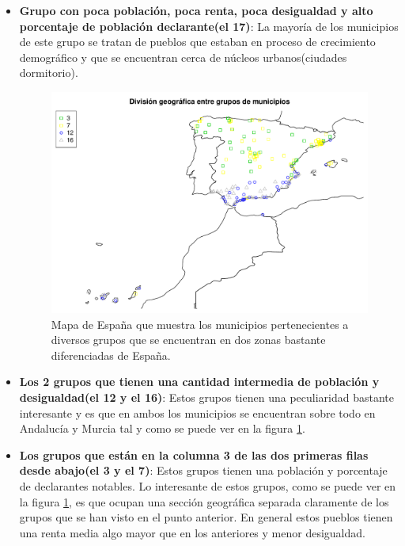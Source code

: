 \documentclass[acmtog, screen]{acmart}
\begin{document}
\begin{itemize}
	\item \textbf{Grupo con poca población, poca renta, poca desigualdad y alto porcentaje de población declarante(el 17)}: La mayoría de los municipios de este grupo se tratan de pueblos que estaban en proceso de crecimiento demográfico y que se encuentran cerca de núcleos urbanos(ciudades dormitorio).
	\begin{figure}
		\includegraphics[width=\columnwidth]{dosEspanas}
		\caption{Mapa de España que muestra los municipios pertenecientes a diversos grupos que se encuentran en dos zonas bastante diferenciadas de España.}
		\label{fig:dosEspanas}
	\end{figure}
	\item \textbf{Los 2 grupos que tienen una cantidad intermedia de población y desigualdad(el 12 y el 16)}: Estos grupos tienen una peculiaridad bastante interesante y es que en ambos los municipios se encuentran sobre todo en Andalucía y Murcia tal y como se puede ver en la figura \ref{fig:dosEspanas}.
	\item \textbf{Los grupos que están en la columna 3 de las dos primeras filas desde abajo(el 3 y el 7)}: Estos grupos tienen una población y porcentaje de declarantes notables. Lo interesante de estos grupos, como se puede ver en la figura \ref{fig:dosEspanas}, es que ocupan una sección geográfica separada claramente de los grupos que se han visto en el punto anterior. En general estos pueblos tienen una renta media algo mayor que en los anteriores y menor desigualdad.	
	\begin{figure}

\end{figure}
\end{itemize}
\end{document}
